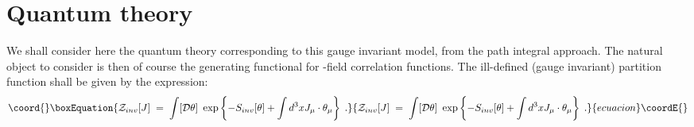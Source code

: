 \documentclass[a4paper,12pt]{article}
\begin{document}
\section{Quantum theory}\label{sec:quantum}
We shall consider here the quantum theory corresponding to this gauge
invariant model, from the path integral approach. The natural object to
consider is then of course the generating functional for \myHighlight{$\theta$}\coordHE{}-field
correlation functions. The ill-defined (gauge invariant) partition function
shall be given by the expression:
\begin{equation}\coord{}\boxEquation{\label{eq:defzinv}
{\mathcal Z}_{inv}[J] \;=\; \int [{\mathcal D}\theta] \,
\,\exp \left\{- S_{inv}[\theta] + \int d^3x J_\mu \cdot \theta_\mu \right\} \;.
}{{\mathcal Z}_{inv}[J] \;=\; \int [{\mathcal D}\theta] \,
\,\exp \left\{- S_{inv}[\theta] + \int d^3x J_\mu \cdot \theta_\mu \right\} \;.
}{ecuacion}\coordE{}\end{equation}
\end{document}
